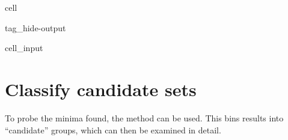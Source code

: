 \documentclass[letterpaper,table,10pt,english]{jupyterBook}
\begin{document}
\begin{sphinxuseclass}{cell}
\begin{sphinxuseclass}{tag_hide-output}\begin{sphinxVerbatimInput}

\begin{sphinxuseclass}{cell_input}
\begin{sphinxVerbatim}[commandchars=\\\{\}]
\PYG{p}{[}\PYG{p}{]}\PYG{p}{[}\PYG{p}{]}
\end{sphinxVerbatim}

\end{sphinxuseclass}\end{sphinxVerbatimInput}

\end{sphinxuseclass}
\end{sphinxuseclass}

\section{Classify candidate sets}
\label{\detokenize{part2/case-study-C2H4_290723:classify-candidate-sets}}
\sphinxAtStartPar
To probe the minima found, the  method can be used. This bins results into “candidate” groups, which can then be examined in detail.
\end{document}
